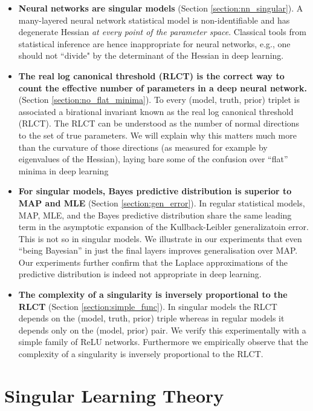 \documentclass{article} %
\begin{document}
\begin{itemize}
    \item \textbf{Neural networks are singular models} (Section \ref{section:nn_singular}). A many-layered neural network statistical model is non-identifiable and has degenerate Hessian \emph{at every point of the parameter space}. Classical tools from statistical inference are hence inappropriate for neural networks, e.g., one should not ``divide" by the determinant of the Hessian in deep learning. 
    \item \textbf{The real log canonical threshold (RLCT) is the correct way to count the effective number of parameters in a deep neural network.} (Section \ref{section:no_flat_minima}). 
    To every (model, truth, prior) triplet is associated a birational invariant known as the real log canonical threshold (RLCT). The RLCT can be understood as the number of normal directions to the set of true parameters. We will explain why this matters much more than the curvature of those directions (as measured for example by eigenvalues of the Hessian), laying bare some of the confusion over ``flat'' minima in deep learning 
    \item \textbf{For singular models, Bayes predictive distribution is superior to MAP and MLE} (Section \ref{section:gen_error}). In regular statistical models, MAP, MLE, and the Bayes predictive distribution share the same leading term in the asymptotic expansion of the Kullback-Leibler generalizatoin error. This is not so in singular models. We illustrate in our experiments that even ``being Bayesian'' in just the final layers improves generalisation over MAP. Our experiments further confirm that the Laplace approximations of the predictive distribution is indeed not appropriate in deep learning.
    \item \textbf{The complexity of a singularity is inversely proportional to the RLCT} (Section \ref{section:simple_func}). In singular models the RLCT depends on the (model, truth, prior) triple whereas in regular models it depends only on the (model, prior) pair.
     We verify this experimentally with a simple family of ReLU networks. Furthermore we empirically observe that the complexity of a singularity is inversely proportional to the RLCT.
\end{itemize}

\section{Singular Learning Theory}
\end{document}

